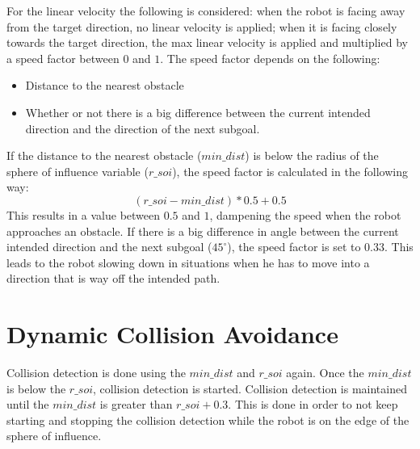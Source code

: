 \documentclass[
	fontsize=12pt,
	headings=small,
	parskip=half,           %
	bibliography=totoc,
	numbers=noenddot,       %
	open=any,               %
]{scrreprt}
\begin{document}
For the linear velocity the following is considered: when the robot is facing away from the target direction, no linear velocity is applied; when it is facing closely towards the target direction, the max linear velocity is applied and multiplied by a speed factor between $0$ and $1$.
The speed factor depends on the following:
\begin{itemize}
	\item Distance to the nearest obstacle
	\item Whether or not there is a big difference between the current intended direction and the direction of the next subgoal.
\end{itemize}
If the distance to the nearest obstacle ($min\_dist$) is below the radius of the sphere of influence variable ($r\_soi$), the speed factor is calculated in the following way:
\begin{equation*}
	(r\_soi - min\_dist) * 0.5 + 0.5
\end{equation*}
This results in a value between $0.5$ and $1$, dampening the speed when the robot approaches an obstacle.
If there is a big difference in angle between the current intended direction and the next subgoal ($45^\circ$), the speed factor is set to $0.33$.
This leads to the robot slowing down in situations when he has to move into a direction that is way off the intended path.

\section{Dynamic Collision Avoidance}


Collision detection is done using the $min\_dist$ and $r\_soi$ again.
Once the $min\_dist$ is below the $r\_soi$, collision detection is started.
Collision detection is maintained until the $min\_dist$ is greater than $r\_soi + 0.3$.
This is done in order to not keep starting and stopping the collision detection while the robot is on the edge of the sphere of influence.
\end{document}
